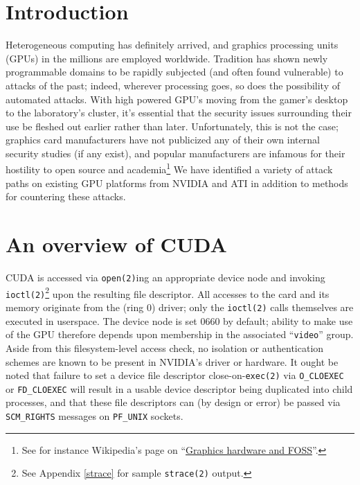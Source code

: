 \documentclass[letterpaper,10pt]{article}
\begin{document}
\begin{multicols}{2}
\section{Introduction}
Heterogeneous computing has definitely arrived, and graphics processing units (GPUs) in the millions are employed worldwide. Tradition has shown newly programmable domains to be rapidly subjected (and often found vulnerable) to attacks of the past; indeed, wherever processing goes, so does the possibility of automated attacks. With high powered GPU's moving from the gamer's desktop to the laboratory's cluster, it's essential that the security issues surrounding their use be fleshed out earlier rather than later. Unfortunately, this is not the case; graphics card manufacturers have not publicized any of their own internal security studies (if any exist), and popular manufacturers are infamous for their
hostility to open source and academia\footnote{See for instance Wikipedia's page on
``\href{http://en.wikipedia.org/wiki/NVIDIA\_and\_FOSS}{Graphics hardware and FOSS}''.}
We have identified a variety of attack paths on existing GPU platforms from NVIDIA and ATI in addition to methods for countering these attacks.

\section{An overview of CUDA}
CUDA is accessed via \texttt{open(2)}ing an appropriate device node and
invoking \texttt{ioctl(2)}\footnote{See Appendix \ref{strace} for sample \texttt{strace(2)}
output.} upon the resulting file descriptor. All accesses to the card and its memory
originate from the (ring 0) driver; only the \texttt{ioctl(2)} calls themselves
are executed in userspace. The device node is set 0660 by default;
ability to make use of the GPU therefore depends upon membership in the
associated ``\texttt{video}'' group. Aside from this filesystem-level access check, no
isolation or authentication schemes are known to be present in NVIDIA's driver
or hardware. It ought be noted that failure to set a device file descriptor
close-on-\texttt{exec(2)} via \texttt{O\_CLOEXEC} or \texttt{FD\_CLOEXEC} will
result in a usable device descriptor being duplicated into child processes,
and that these file descriptors can (by design or error) be passed via
\texttt{SCM\_RIGHTS} messages on \texttt{PF\_UNIX} sockets.


\end{multicols}
\end{document}
